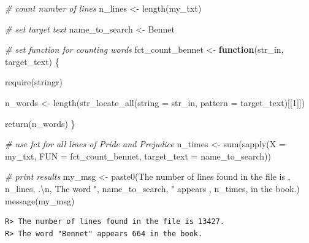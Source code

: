 \documentclass[
  12pt,
]{book}
\newenvironment{Shaded}{\begin{snugshade}}{\end{snugshade}}
\newcommand{\AttributeTok}[1]{\textcolor[rgb]{0.61,0.61,0.61}{#1}}
\newcommand{\CommentTok}[1]{\textcolor[rgb]{0.37,0.37,0.37}{\textit{#1}}}
\newcommand{\ControlFlowTok}[1]{\textcolor[rgb]{0.27,0.27,0.27}{\textbf{#1}}}
\newcommand{\DecValTok}[1]{\textcolor[rgb]{0.06,0.06,0.06}{#1}}
\newcommand{\FunctionTok}[1]{\textcolor[rgb]{0,0,0}{#1}}
\newcommand{\NormalTok}[1]{#1}
\newcommand{\OtherTok}[1]{\textcolor[rgb]{0.37,0.37,0.37}{#1}}
\newcommand{\SpecialCharTok}[1]{\textcolor[rgb]{0,0,0}{#1}}
\newcommand{\StringTok}[1]{\textcolor[rgb]{0.5,0.5,0.5}{#1}}
\begin{document}
\begin{Shaded}
\begin{Highlighting}[]
\CommentTok{\# count number of lines}
\NormalTok{n\_lines }\OtherTok{\textless{}{-}} \FunctionTok{length}\NormalTok{(my\_txt)}

\CommentTok{\# set target text}
\NormalTok{name\_to\_search }\OtherTok{\textless{}{-}} \StringTok{\textquotesingle{}Bennet\textquotesingle{}}
  
\CommentTok{\# set function for counting words}
\NormalTok{fct\_count\_bennet }\OtherTok{\textless{}{-}} \ControlFlowTok{function}\NormalTok{(str\_in, target\_text) \{}
  
  \FunctionTok{require}\NormalTok{(stringr)}
  

\NormalTok{  n\_words }\OtherTok{\textless{}{-}} \FunctionTok{length}\NormalTok{(}\FunctionTok{str\_locate\_all}\NormalTok{(}\AttributeTok{string =}\NormalTok{ str\_in, }
                                   \AttributeTok{pattern =}\NormalTok{ target\_text)[[}\DecValTok{1}\NormalTok{]])}
  
  \FunctionTok{return}\NormalTok{(n\_words)}
\NormalTok{\}}

\CommentTok{\# use fct for all lines of Pride and Prejudice}
\NormalTok{n\_times }\OtherTok{\textless{}{-}} \FunctionTok{sum}\NormalTok{(}\FunctionTok{sapply}\NormalTok{(}\AttributeTok{X =}\NormalTok{ my\_txt, }
                      \AttributeTok{FUN =}\NormalTok{ fct\_count\_bennet, }
                      \AttributeTok{target\_text =}\NormalTok{ name\_to\_search))}

\CommentTok{\# print results}
\NormalTok{my\_msg }\OtherTok{\textless{}{-}} \FunctionTok{paste0}\NormalTok{(}\StringTok{\textquotesingle{}The number of lines found in the file is \textquotesingle{}}\NormalTok{, }
\NormalTok{                 n\_lines, }\StringTok{\textquotesingle{}.}\SpecialCharTok{\textbackslash{}n}\StringTok{\textquotesingle{}}\NormalTok{,}
                 \StringTok{\textquotesingle{}The word "\textquotesingle{}}\NormalTok{, name\_to\_search, }\StringTok{\textquotesingle{}" appears \textquotesingle{}}\NormalTok{, }
\NormalTok{                 n\_times, }\StringTok{\textquotesingle{} in the book.\textquotesingle{}}\NormalTok{)}
\FunctionTok{message}\NormalTok{(my\_msg)}
\end{Highlighting}
\end{Shaded}

\begin{verbatim}
R> The number of lines found in the file is 13427.
R> The word "Bennet" appears 664 in the book.
\end{verbatim}
\end{document}
